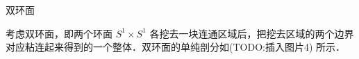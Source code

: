 \begin{example}{双环面}

考虑双环面，即两个环面 $S^1\times S^1$ 各挖去一块连通区域后，把挖去区域的两个边界对应粘连起来得到的一个整体．双环面的单纯剖分如(TODO:插入图片4) 所示．



\end{example}
